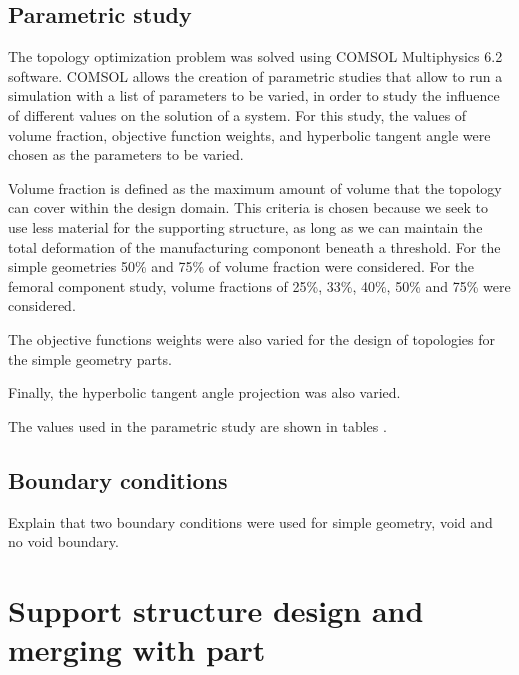 \documentclass[../main.tex]{subfiles}
\begin{document}
\subsection{Parametric study}

The topology optimization problem was solved using COMSOL Multiphysics 6.2 software. COMSOL allows the creation of parametric studies that allow to run a simulation with a list of parameters to be varied, in order to study the influence of different values on the solution of a system. For this study, the values of volume fraction, objective function weights, and hyperbolic tangent angle were chosen as the parameters to be varied.

Volume fraction is defined as the maximum amount of volume that the topology can cover within the design domain. This criteria is chosen because we seek to use less material for the supporting structure, as long as we can maintain the total deformation of the manufacturing componont beneath a threshold. For the simple geometries 50\% and 75\% of volume fraction were considered. For the femoral component study, volume fractions of 25\%, 33\%, 40\%, 50\% and 75\% were considered. 

The objective functions weights were also varied for the design of topologies for the simple geometry parts. 

Finally, the hyperbolic tangent angle projection was also varied. 

The values used in the parametric study are shown in tables .


\subsection{Boundary conditions}

Explain that two boundary conditions were used for simple geometry, void and no void boundary.



\section{Support structure design and merging with part}
\end{document}
